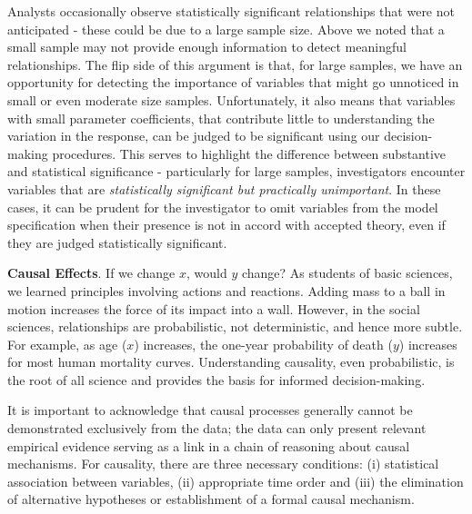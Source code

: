 
Analysts occasionally observe statistically significant
relationships that were not anticipated - these could be due to a
large sample size. Above we noted that a small sample may not
provide enough information to detect meaningful relationships. The
flip side of this argument is that, for large samples, we have an
opportunity for detecting the importance of variables that might go
unnoticed in small or even moderate size samples. Unfortunately, it
also means that variables with small parameter coefficients, that
contribute little to understanding the variation in the response,
can be judged to be significant using our decision-making
procedures. This serves to highlight the difference between
substantive and statistical significance - particularly for large
samples, investigators encounter variables that are
\textit{statistically significant but practically unimportant}. In
these cases, it can be prudent for the investigator to omit
variables from the model specification when their presence is not in
accord with accepted theory, even if they are judged statistically
significant.



\noindent \textbf{Causal Effects}. If we change $x$, would $y$
change? As students of basic sciences, we learned principles
involving actions and reactions. Adding mass to a ball in motion
increases the force of its impact into a wall. However, in the
social sciences, relationships are probabilistic, not deterministic,
and hence more subtle. For example, as age ($x$) increases, the
one-year probability of death ($y$) increases for most human
mortality curves. Understanding causality, even probabilistic, is
the root of all science and provides the basis for informed
decision-making.

It is important to acknowledge that causal processes generally
cannot be demonstrated exclusively from the data; the data can only
present relevant empirical evidence serving as a link in a chain of
reasoning about causal mechanisms. For causality, there are three
necessary conditions: (i) statistical association between variables,
(ii) appropriate time order and (iii) the elimination of alternative
hypotheses or establishment of a formal causal mechanism.

